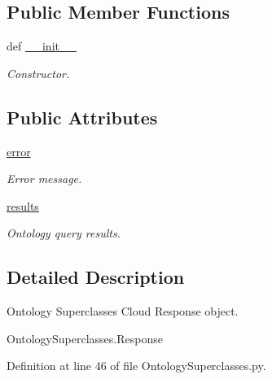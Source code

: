 \subsection*{Public Member Functions}
\begin{DoxyCompactItemize}
\item 
def \hyperlink{classRappCloud_1_1CloudMsgs_1_1OntologySuperclasses_1_1OntologySuperclasses_1_1Response_a6d32b3455860a0a65329139f26221a44}{\-\_\-\-\_\-init\-\_\-\-\_\-}
\begin{DoxyCompactList}\small\item\em Constructor. \end{DoxyCompactList}\end{DoxyCompactItemize}
\subsection*{Public Attributes}
\begin{DoxyCompactItemize}
\item 
\hyperlink{classRappCloud_1_1CloudMsgs_1_1OntologySuperclasses_1_1OntologySuperclasses_1_1Response_a3b5c3f56b6c85763be8abcd232010f02}{error}
\begin{DoxyCompactList}\small\item\em Error message. \end{DoxyCompactList}\item 
\hyperlink{classRappCloud_1_1CloudMsgs_1_1OntologySuperclasses_1_1OntologySuperclasses_1_1Response_abb166b09e6fbaa45b0c49b6a763ce9cd}{results}
\begin{DoxyCompactList}\small\item\em Ontology query results. \end{DoxyCompactList}\end{DoxyCompactItemize}


\subsection{Detailed Description}
\begin{DoxyVerb}Ontology Superclasses Cloud Response object.

OntologySuperclasses.Response
\end{DoxyVerb}
 

Definition at line 46 of file Ontology\-Superclasses.\-py.




